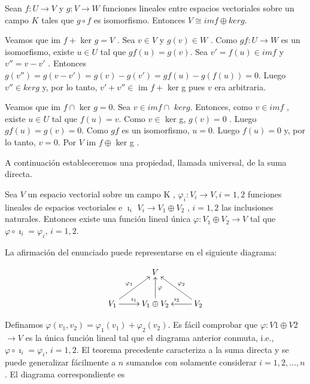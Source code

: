 			\begin{coro}
				Sean $ f : U \rightarrow V $ y $ g: V \rightarrow W $ funciones lineales entre espacios vectoriales sobre un campo $ K $ tales que $ g \circ f $ es isomorfismo.
				Entonces $ V  \cong im f \oplus ker g $.
			\end{coro}
		
			\begin{demo}
				Veamos que  im $ f + $ ker $ g = V $  . Sea $ v \in V $ y $ g(v) \in W $ . Como $ gf : U \rightarrow W $ es un isomorfismo, existe $  u \in U $ tal que $ gf (u) = g(v) $. Sea $ v' = f (u) \in im f $ y $ v'' = v - v' $ . Entonces $ g(v'') = g(v - v' ) = g(v) - g(v' ) = gf (u) - g(f (u)) = 0 $. Luego $ v'' \in ker g $ y, por lo tanto, $ v' + v'' \in$ im $ f + $ ker g  pues $ v $ era arbitraria.
				
				Veamos que im $ f \cap $ ker $g = {0} $. Sea $ v \in im f  \cap $ $ker g $. Entonces, como $ v \in im f $ , existe $ u \in U $ tal que $ f (u) = v $. Como $ v \in $ ker g, $ g(v) = 0 $ . Luego $ gf(u) = g(v) = 0 $.
				Como $ gf $ es un isomorfismo, $ u = 0 $. Luego $ f (u) = 0 $ y, por lo tanto, $ v = 0 $. Por
				$ V $  im $ f  \oplus $ ker g .
			\end{demo}
			
			A continuación estableceremos una propiedad, llamada universal, de la suma
			directa.
			 \begin{teo}
			 	Sea $ V $ un espacio vectorial sobre un campo K ,
			 	$ \varphi_{i} : V_{i} \rightarrow V , i = 1, 2 $ funciones lineales de espacios vectoriales e $\imath_{i} $ $ V_{i} \rightarrow V_{1} \oplus V_{2}$ , $ i = 1, 2 $ las inclusiones naturales. 
			 	Entonces existe una función lineal única $ \varphi : V_{1} \oplus V_{2} \rightarrow V $ tal que $ \varphi \circ \imath_{i} = \varphi_{i} $, $ i = 1, 2 $.
			 	\end{teo}
		 		\begin{demo}
		 			La afirmación del enunciado puede representarse en el siguiente diagrama:	 
		 		\end{demo}
	 		 \[  \xymatrix{
	 		 	&V \\
	 		  	V_{1} \ar[r]^{\imath_{1}} \ar[ru]^{\varphi_{1}} & V_{1} \oplus V_{2} \ar[u]_{\varphi} & V_{2}\ar[l]_{\imath_{2}} \ar[lu]_{\varphi_{2}}
	 		  }
	 		   \]
	 		  
	 		  Definamos $\varphi(v_{1} , v_{2}) = \varphi_{1} (v_{1}) + \varphi_{2} (v_{2})$. Es fácil comprobar que $ \varphi: V1 \oplus V2 $ $\rightarrow V$
	 		  es la única  función lineal tal que el diagrama anterior conmuta, i.e., $ \varphi \circ \imath_{i} = \varphi_{i} $, $  i = 1, 2 $.
	 		  El teorema precedente caracteriza a la suma directa y se puede generalizar
	 		  fácilmente a $ n $ sumandos con solamente considerar $ i = 1, 2, . . . , n $. El diagrama
	 		  correspondiente es
	 		   
